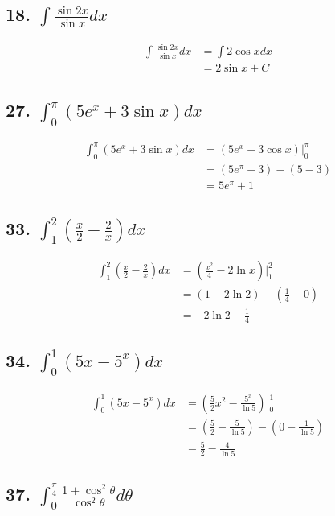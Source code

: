 \documentclass{article}
\begin{document}
    \subsection*{18. $\int \frac{\sin 2x}{\sin x} dx$}

    $$\begin{aligned}
        \int \frac{\sin 2x}{\sin x}dx &= \int 2\cos x dx \\
        &= 2\sin x + C
    \end{aligned}$$

    \subsection*{27. $\int_0^\pi(5e^x + 3\sin x) dx$}

    $$\begin{aligned}
        \int_0^\pi (5e^x + 3\sin x) dx &= (5e^x - 3\cos x)\biggl|_{0}^{\pi} \\
        &= (5e^\pi + 3) - (5 - 3) \\
        &= 5e^\pi + 1
    \end{aligned}$$

    \subsection*{33. $\int_1^2(\frac x 2 - \frac 2 x)dx$}

    $$\begin{aligned}
        \int_1^2(\frac x 2 - \frac 2 x) dx &= (\frac{x^2}{4} - 2 \ln x)\biggl|_1^2 \\
        &= (1 - 2\ln 2) - (\frac 1 4 - 0) \\
        &= -2\ln 2 - \frac 1 4
    \end{aligned}$$

    \subsection*{34. $\int_0^1(5x - 5^x) dx$}

    $$\begin{aligned}
        \int_0^1(5x - 5^x) dx &= (\frac 5 2 x^2 - \frac{5^x}{\ln 5})\biggl| _0^1 \\
        &= (\frac 5 2 - \frac{5}{\ln 5}) - (0 - \frac{1}{\ln 5}) \\
        &= \frac{5}{2} - \frac{4}{\ln 5}
    \end{aligned}$$

    \subsection*{37. $\int_0^{\frac \pi 4}\frac{1 + \cos ^2 \theta}{\cos ^2 \theta} d\theta$}
\end{document}
